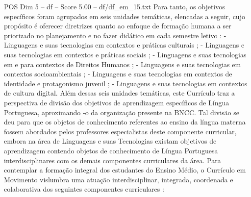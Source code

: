 \begin{textsample}{POS Dim 5 – df – Score 5.00 – df/df\_em\_15.txt}
Para tanto, os objetivos específicos foram agrupados em seis unidades temáticas, elencadas a seguir, cujo propósito é oferecer diretrizes quanto ao enfoque de formação humana a ser priorizado no planejamento e no fazer didático em cada semestre letivo : - Linguagens e suas tecnologias em contextos e práticas culturais ; - Linguagens e suas tecnologias em contextos e práticas sociais ; - Linguagens e suas tecnologias em e para contextos de Direitos Humanos ; - Linguagens e suas tecnologias em contextos socioambientais ; - Linguagens e suas tecnologias em contextos de identidade e protagonismo juvenil ; - Linguagens e suas tecnologias em contextos de cultura digital.
Além dessas seis unidades temáticas, este Currículo traz a perspectiva de divisão dos objetivos de aprendizagem específicos de Língua Portuguesa, aproximando -o da organização presente na BNCC.
Tal divisão se deu para que os objetos de conhecimento referentes ao ensino da língua materna fossem abordados pelos professores especialistas deste componente curricular, embora na área de Linguagens e suas Tecnologias existam objetivos de aprendizagem contendo objetos de conhecimento de Língua Portuguesa interdisciplinares com os demais componentes curriculares da área.
Para contemplar a formação integral dos estudantes do Ensino Médio, o Currículo em Movimento vislumbra uma atuação interdisciplinar, integrada, coordenada e colaborativa dos seguintes componentes curriculares :

\end{textsample}
